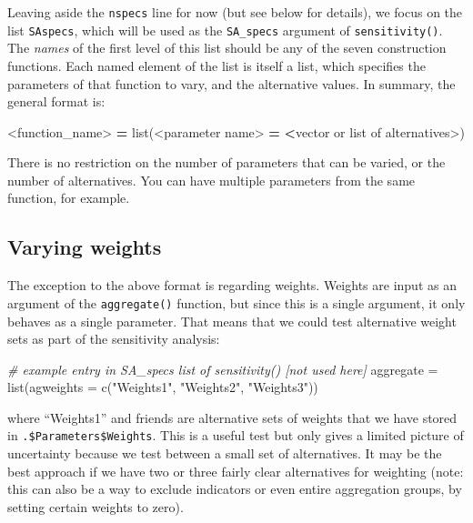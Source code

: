 \documentclass[
]{book}
\newenvironment{Shaded}{\begin{snugshade}}{\end{snugshade}}
\newcommand{\AttributeTok}[1]{\textcolor[rgb]{0.77,0.63,0.00}{#1}}
\newcommand{\CommentTok}[1]{\textcolor[rgb]{0.56,0.35,0.01}{\textit{#1}}}
\newcommand{\ErrorTok}[1]{\textcolor[rgb]{0.64,0.00,0.00}{\textbf{#1}}}
\newcommand{\FunctionTok}[1]{\textcolor[rgb]{0.00,0.00,0.00}{#1}}
\newcommand{\NormalTok}[1]{#1}
\newcommand{\OtherTok}[1]{\textcolor[rgb]{0.56,0.35,0.01}{#1}}
\newcommand{\SpecialCharTok}[1]{\textcolor[rgb]{0.00,0.00,0.00}{#1}}
\newcommand{\StringTok}[1]{\textcolor[rgb]{0.31,0.60,0.02}{#1}}
\begin{document}
Leaving aside the \texttt{nspecs} line for now (but see below for details), we focus on the list \texttt{SAspecs}, which will be used as the \texttt{SA\_specs} argument of \texttt{sensitivity()}. The \emph{names} of the first level of this list should be any of the seven construction functions. Each named element of the list is itself a list, which specifies the parameters of that function to vary, and the alternative values. In summary, the general format is:

\begin{Shaded}
\begin{Highlighting}[]
\SpecialCharTok{\textless{}}\NormalTok{function\_name}\SpecialCharTok{\textgreater{}} \ErrorTok{=} \FunctionTok{list}\NormalTok{(}\SpecialCharTok{\textless{}}\NormalTok{parameter name}\SpecialCharTok{\textgreater{}} \ErrorTok{=} \ErrorTok{\textless{}}\NormalTok{vector or list of alternatives}\SpecialCharTok{\textgreater{}}\NormalTok{)}
\end{Highlighting}
\end{Shaded}

There is no restriction on the number of parameters that can be varied, or the number of alternatives. You can have multiple parameters from the same function, for example.

\hypertarget{varying-weights}{%
\subsection{Varying weights}\label{varying-weights}}

The exception to the above format is regarding weights. Weights are input as an argument of the \texttt{aggregate()} function, but since this is a single argument, it only behaves as a single parameter. That means that we could test alternative weight sets as part of the sensitivity analysis:

\begin{Shaded}
\begin{Highlighting}[]
\CommentTok{\# example entry in SA\_specs list of sensitivity() [not used here]}
\NormalTok{aggregate }\OtherTok{=} \FunctionTok{list}\NormalTok{(}\AttributeTok{agweights =} \FunctionTok{c}\NormalTok{(}\StringTok{"Weights1"}\NormalTok{, }\StringTok{"Weights2"}\NormalTok{, }\StringTok{"Weights3"}\NormalTok{))}
\end{Highlighting}
\end{Shaded}

where ``Weights1'' and friends are alternative sets of weights that we have stored in \texttt{.\$Parameters\$Weights}. This is a useful test but only gives a limited picture of uncertainty because we test between a small set of alternatives. It may be the best approach if we have two or three fairly clear alternatives for weighting (note: this can also be a way to exclude indicators or even entire aggregation groups, by setting certain weights to zero).
\end{document}
